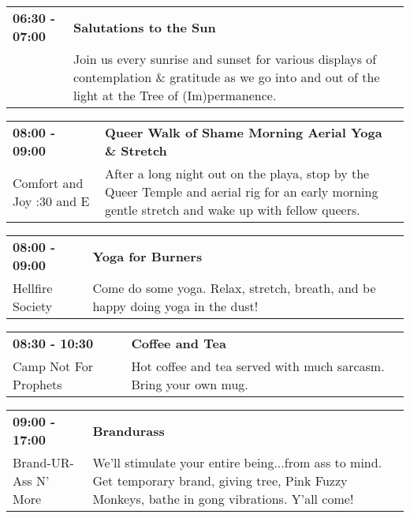 \begin{tabular}{ p{1in} p{2.2in} }
    \textbf{06:30 - 07:00} & \textbf{Salutations to the Sun} \\
    ~ \newline  & Join us every sunrise and sunset for various displays of contemplation \& gratitude as we go into and out of the light at the Tree of (Im)permanence. \\
    \hline 
\end{tabular}
    
\begin{tabular}{ p{1in} p{2.2in} }
    \textbf{08:00 - 09:00} & \textbf{Queer Walk of Shame Morning Aerial Yoga \& Stretch} \\
    Comfort and Joy \newline 7:30 and E & After a long night out on the playa, stop by the Queer Temple and aerial rig for an early morning gentle stretch and wake up with fellow queers. \\
    \hline 
\end{tabular}
    
\begin{tabular}{ p{1in} p{2.2in} }
    \textbf{08:00 - 09:00} & \textbf{Yoga for Burners} \\
    Hellfire Society \newline  & Come do some yoga. Relax, stretch, breath, and be happy doing yoga in the dust! \\
    \hline 
\end{tabular}
    
\begin{tabular}{ p{1in} p{2.2in} }
    \textbf{08:30 - 10:30} & \textbf{Coffee and Tea} \\
    Camp Not For Prophets \newline  & Hot coffee and tea served with much sarcasm.  Bring your own mug. \\
    \hline 
\end{tabular}
    
\begin{tabular}{ p{1in} p{2.2in} }
    \textbf{09:00 - 17:00} & \textbf{Brandurass} \\
    Brand-UR-Ass N' More \newline  & We'll stimulate your entire being...from ass to mind. Get temporary brand, giving tree, Pink Fuzzy Monkeys, bathe in gong vibrations. Y'all come! \\
    \hline 
\end{tabular}
    
